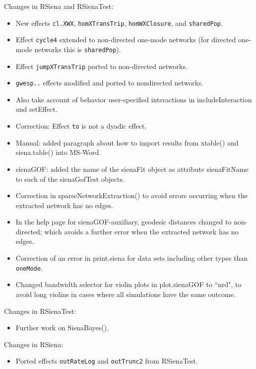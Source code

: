 \documentclass[a4paper,fleqn,11pt]{article}
\newcommand{\+}{\, + \,}
\newcommand{\sfn}[1]{\textsf{#1}}
\begin{document}
\begin{small}
\begin{itemize}
Changes in RSiena and RSienaTest:
\begin{itemize}
\item New effects \texttt{cl.XWX}, \texttt{homXTransTrip},
    \texttt{homWXClosure}, and \texttt{sharedPop}.
 \item Effect \texttt{cycle4} extended to non-directed one-mode networks
    (for directed one-mode networks this is \texttt{sharedPop}).
 \item Effect \texttt{jumpXTransTrip} ported to non-directed networks.
 \item \texttt{gwesp..}  effects modified and ported to nondirected networks.
 \item Also take account of behavior user-specified interactions in
     \sfn{includeInteraction} and \sfn{setEffect}.
 \item Correction: Effect \texttt{to} is not a dyadic effect.
 \item Manual: added paragraph about how to import results from
     \sfn{xtable()} and \sfn{siena.table()} into MS-Word.
 \item \sfn{sienaGOF}: added the name of the \sfn{sienaFit} object
     as attribute \sfn{sienaFitName} to each of the \sfn{sienaGofTest} objects.
 \item Correction in \sfn{sparseNetworkExtraction()} to avoid errors occurring
     when the extracted network has no edges.
 \item In the help page for \sfn{sienaGOF-auxiliary}, geodesic distances
     changed to non-directed; which avoids a further error
     when the extracted network has no edges.
 \item Correction of an error in \sfn{print.siena} for data sets including
     other types than \texttt{oneMode}.
 \item Changed bandwidth selector for violin plots in \sfn{plot.sienaGOF} to ``nrd",
     to avoid long violins in cases where all simulations have the same outcome.
\end{itemize}

Changes in RSienaTest:
\begin{itemize}
\item Further work on \sfn{SienaBayes()}.
\end{itemize}

Changes in RSiena:
\begin{itemize}
  \item Ported effects \texttt{outRateLog} and \texttt{outTrunc2} from RSienaTest.
\end{itemize}


\end{itemize}
\end{small}
\end{document}
